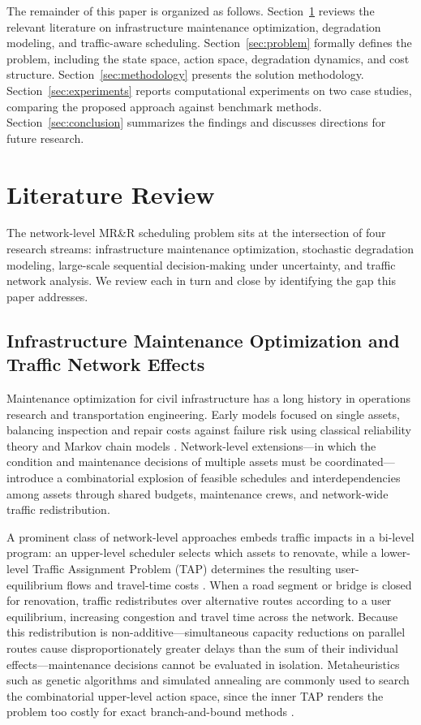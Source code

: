 \documentclass[3p, twocolumn]{elsarticle}
\begin{document}
The remainder of this paper is organized as follows. Section~\ref{sec:literature} reviews the relevant literature on infrastructure maintenance optimization, degradation modeling, and traffic-aware scheduling. Section~\ref{sec:problem} formally defines the problem, including the state space, action space, degradation dynamics, and cost structure. Section~\ref{sec:methodology} presents the solution methodology. Section~\ref{sec:experiments} reports computational experiments on two case studies, comparing the proposed approach against benchmark methods. Section~\ref{sec:conclusion} summarizes the findings and discusses directions for future research.

\section{Literature Review}
\label{sec:literature}

The network-level MR\&R scheduling problem sits at the intersection of four research streams: infrastructure maintenance optimization, stochastic degradation modeling, large-scale sequential decision-making under uncertainty, and traffic network analysis. We review each in turn and close by identifying the gap this paper addresses.

\subsection{Infrastructure Maintenance Optimization and Traffic Network Effects}

Maintenance optimization for civil infrastructure has a long history in operations research and transportation engineering. Early models focused on single assets, balancing inspection and repair costs against failure risk using classical reliability theory and Markov chain models \citep{frangopol_probabilistic_2004, robelin_history-dependent_2007}. Network-level extensions---in which the condition and maintenance decisions of multiple assets must be coordinated---introduce a combinatorial explosion of feasible schedules and interdependencies among assets through shared budgets, maintenance crews, and network-wide traffic redistribution.

A prominent class of network-level approaches embeds traffic impacts in a bi-level program: an upper-level scheduler selects which assets to renovate, while a lower-level Traffic Assignment Problem (TAP) determines the resulting user-equilibrium flows and travel-time costs \citep{ngOptimalLongTermInfrastructure2009}. When a road segment or bridge is closed for renovation, traffic redistributes over alternative routes according to a user equilibrium, increasing congestion and travel time across the network. Because this redistribution is non-additive---simultaneous capacity reductions on parallel routes cause disproportionately greater delays than the sum of their individual effects---maintenance decisions cannot be evaluated in isolation. Metaheuristics such as genetic algorithms and simulated annealing are commonly used to search the combinatorial upper-level action space, since the inner TAP renders the problem too costly for exact branch-and-bound methods \citep{ngOptimalLongTermInfrastructure2009, ouyangPavementResurfacingPlanning2007}.
\end{document}
